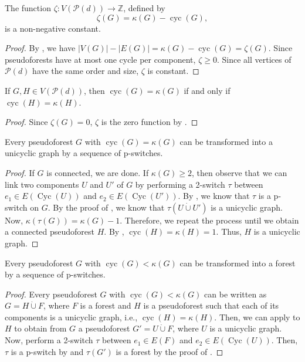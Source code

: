 \documentclass{BICA}
\newcommand{\cycles}{\operatorname{cyc}}
\newcommand{\Cycles}{\operatorname{Cyc}}
\begin{document}
\begin{proposition}
	\label{zeta_constant}
	The function $\zeta :V(\mathcal{P}(d))\rightarrow \mathbb{Z}$, defined by
	\[ \zeta(G)= \kappa(G)-\cycles(G), \]
	is a non-negative constant.
\end{proposition}

\begin{proof}
	By , we have $|V(G)|-|E(G)|=\kappa(G)-\cycles(G)=\zeta(G)$. Since pseudoforests have at most one cycle per component, $\zeta\geq 0$. Since all vertices of $\mathcal{P}(d)$ have the same order and size, $\zeta$ is constant.
\end{proof}

\begin{corollary}\label{coro_ciclos}
	If $G,H\in V(\mathcal{P}(d))$, then $\cycles(G)=\kappa(G)$ if and only if $\cycles(H)=\kappa(H)$.
\end{corollary}

\begin{proof}
	Since $\zeta(G)=0$, $\zeta$ is the zero function by .
\end{proof}

\begin{lemma}
	\label{pseudo>>>unic}

	Every pseudoforest $G$ with $\cycles(G)=\kappa(G)$ can be transformed into a unicyclic graph by a sequence of p-switches.
\end{lemma}

\begin{proof}
	If $G$ is connected, we are done. If $\kappa(G)\geq 2$, then observe that we can link two components $U$ and $U'$ of $G$ by performing a 2-switch $\tau$ between $e_{1}\in E(\Cycles(U))$ and $e_{2}\in E(\Cycles(U'))$. By , we know that $\tau$ is a p-switch on $G$. By the proof of , we know that $\tau(U\dot{\cup}U')$ is a unicyclic graph. Now, $\kappa(\tau(G))=\kappa(G)-1$. Therefore, we repeat the process until we obtain a connected pseudoforest $H$. By , $\cycles(H)=\kappa(H)=1$. Thus, $H$ is a unicyclic graph.
\end{proof}

\begin{lemma}
	\label{pseudo>>>forest}

	Every pseudoforest $G$ with $\cycles(G)<\kappa(G)$ can be transformed into a forest by a sequence of p-switches.
\end{lemma}

\begin{proof}
	Every pseudoforest $G$ with $\cycles(G)<\kappa(G)$ can be written as $G=H\dot{\cup}F$, where $F$ is a forest and $H$ is a pseudoforest such that each of its components is a unicyclic graph, i.e., $\cycles(H)=\kappa(H)$. Then, we can apply  to $H$ to obtain from $G$ a pseudoforest $G'=U\dot{\cup}F$, where $U$ is a unicyclic graph. Now, perform a 2-switch $\tau$ between $e_{1}\in E(F)$ and $e_{2}\in E(\Cycles(U))$. Then, $\tau$ is a p-switch by   and $\tau(G')$ is a forest by the proof of .
\end{proof}
\end{document}
